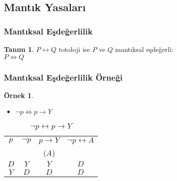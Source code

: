 \documentclass[dvipsnames]{beamer}
\theoremstyle{definition}
\newtheorem{tanim}[theorem]{Tanım}
\theoremstyle{example}
\newtheorem{ornek}[theorem]{Örnek}
\theoremstyle{plain}
\begin{document}
\subsection{Mantık Yasaları}

\begin{frame}
  \frametitle{Mantıksal Eşdeğerlilik}

  \begin{tanim}
    $P \leftrightarrow Q$ totoloji ise $P$ ve $Q$ \alert{mantıksal eşdeğerli}:\\
    $P \Leftrightarrow Q$
  \end{tanim}
\end{frame}

\begin{frame}
  \frametitle{Mantıksal Eşdeğerlilik Örneği}

  \begin{ornek}
    \begin{itemize}
      \item $\neg p \Leftrightarrow p \rightarrow Y$
    \end{itemize}

    \begin{table}
      \caption{$\neg p \leftrightarrow p \rightarrow Y$}
      \begin{tabular}{|c|c|c||c|}\hline
        $p$ & $\neg p$ & $p \rightarrow Y$ & $\neg p \leftrightarrow A$\\
            &          & ($A$)             &\\\hline\hline
        $D$ & $Y$ & $Y$ & $D$\\\hline
        $Y$ & $D$ & $D$ & $D$\\\hline
      \end{tabular}
    \end{table}
  \end{ornek}
\end{frame}
\end{document}
